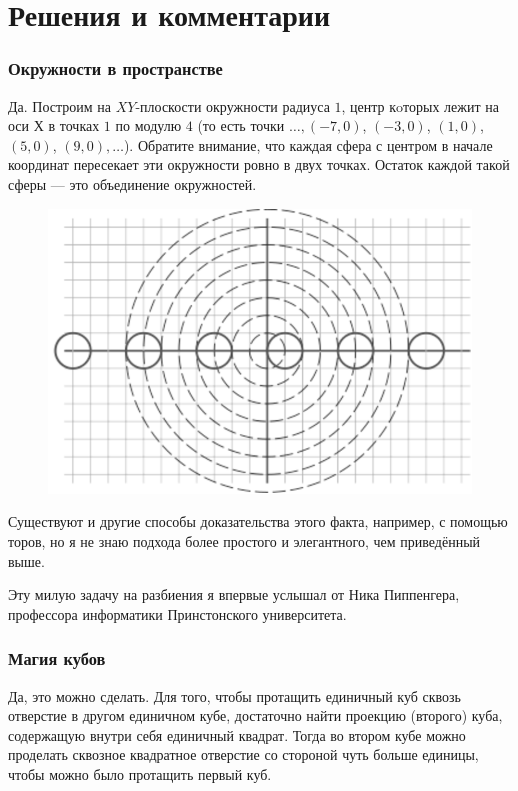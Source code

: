 \section*{Решения и комментарии}

\subsubsection*{Окружности в пространстве}%

Да.
Построим на $XY$-плоскости окружности радиуса $1$, центр кoторых лежит на оси $Х$ в точках $1$ по модулю $4$ (то есть точки $\dots, (-7,0)$, $(-3,0)$, $(1,0)$, $(5,0)$, $(9,0),\dots$).
Обратите внимание, что каждая сфера с центром в начале координат пересекает эти окружности ровно в двух точках.
Остаток каждой такой сферы --- это объединение окружностей.
\heart

\begin{figure}[h!]
\centering
\includegraphics[scale=0.7]{Figs/Geometry/ring}
\end{figure} 

Существуют и другие способы доказательства этого факта, например, с помощью торов, но я не знаю подхода более простого и элегантного, чем приведённый выше.

Эту милую задачу на разбиения я впервые услышал от Ника Пиппенгера, %
профессора информатики Принстонского университета.

\subsubsection*{Магия кубов}%

Да, это можно сделать.
Для того, чтобы протащить единичный куб сквозь отверстие в другом единичном кубе, достаточно найти проекцию (второго) куба, содержащую внутри себя единичный квадрат.
Тогда во втором кубе можно проделать сквозное квадратное отверстие %
со стороной чуть больше единицы, чтобы можно было протащить первый куб.

